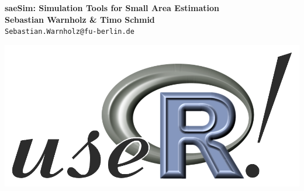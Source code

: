 \documentclass[a0,portrait]{a0poster}\usepackage[]{graphicx}\usepackage[]{color}
\begin{document}


\begin{minipage}[b]{0.75\linewidth}
\Huge \color{NavyBlue} \textbf{saeSim: Simulation Tools for Small Area Estimation} \color{Black}\\[0.5cm] %
\huge \textbf{ Sebastian Warnholz \& Timo Schmid }\\[0.5cm] %
\Large \texttt{Sebastian.Warnholz@fu-berlin.de} \\
\end{minipage}
%
\begin{minipage}[b]{0.25\linewidth}
\hfill\includegraphics[width=0.9\linewidth]{logo.png}\\
\end{minipage}

\vspace{1cm} %

\end{document}

